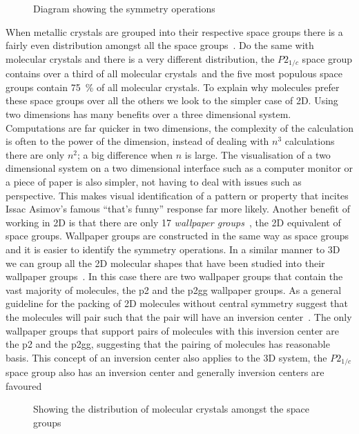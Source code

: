 \begin{figure}
    \caption{Diagram showing the symmetry operations}
    \label{fig:symmetry ops}
\end{figure}

When metallic crystals are grouped into their respective space groups there is a fairly even distribution amongst all the space groups~. Do the same with molecular crystals and there is a very different distribution, the $P2_{1/c}$ space group contains over a third of all molecular crystals~\tocite and the five most populous space groups contain \SI{75}{\percent} of all molecular crystals. To explain why molecules prefer these space groups over all the others we look to the simpler case of 2D. Using two dimensions has many benefits over a three dimensional system. Computations are far quicker in two dimensions, the complexity of the calculation is often to the power of the dimension, instead of dealing with $n^3$ calculations there are only $n^2$; a big difference when $n$ is large. The visualisation of a two dimensional system on a two dimensional interface such as a computer monitor or a piece of paper is also simpler, not having to deal with issues such as perspective. This makes visual identification of a pattern or property that incites Issac Asimov's famous ``that's funny'' response far more likely. Another benefit of working in 2D is that there are only 17 \emph{wallpaper groups}~, the 2D equivalent of space groups. Wallpaper groups are constructed in the same way as space groups and it is easier to identify the symmetry operations. In a similar manner to 3D we can group all the 2D molecular shapes that have been studied into their wallpaper groups~. In this case there are two wallpaper groups that contain the vast majority of molecules, the p2 and the p2gg wallpaper groups. As a general guideline for the packing of 2D molecules without central symmetry \textcite{torquato:12} suggest that the molecules will pair such that the pair will have an inversion center~. The only wallpaper groups that support pairs of molecules with this inversion center are the p2 and the p2gg, suggesting that the pairing of molecules has reasonable basis. This concept of an inversion center also applies to the 3D system, the $P2_{1/c}$ space group also has an inversion center and generally inversion centers are favoured~\cite{brock:94}

\begin{figure}
    \caption{Showing the distribution of molecular crystals amongst the space groups}
    \label{fig:space dist}
\end{figure}

